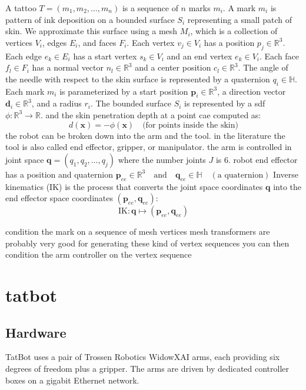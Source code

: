 \documentclass[11pt]{article}
\begin{document}
A tattoo $T = (m_1, m_2, \ldots, m_n)$ is a sequence of $n$ marks $m_i$.
A mark $m_i$ is pattern of ink deposition on a bounded surface $S_i$ representing a small patch of skin.
We approximate this surface using a mesh $M_i$, which is a collection of vertices $V_i$, edges $E_i$, and faces $F_i$.
Each vertex $v_j \in V_i$ has a position $p_j \in \mathbb{R}^3$.
Each edge $e_k \in E_i$ has a start vertex $s_k \in V_i$ and an end vertex $e_k \in V_i$.
Each face $f_l \in F_i$ has a normal vector $n_l \in \mathbb{R}^3$ and a center position $c_l \in \mathbb{R}^3$.
The angle of the needle with respect to the skin surface is represented by a quaternion $q_i \in \mathbb{H}$.
Each mark $m_i$ is parameterized by a start position \( \mathbf{p}_i \in \mathbb{R}^3 \), a direction vector \( \mathbf{d}_i \in \mathbb{R}^3 \), and a radius \( r_i \).
The bounded surface $S_i$ is represented by a sdf $\phi: \mathbb{R}^3 \to \mathbb{R}$.
and the skin penetration depth at a point cae computed as:
\[
d(\mathbf{x}) = -\phi(\mathbf{x}) \quad \text{(for points inside the skin)}
\]
the robot can be broken down into the arm and the tool.
in the literature the tool is also called end effector, gripper, or manipulator.
the arm is controlled in joint space $\mathbf{q} = (q_1, q_2, \ldots, q_j)$ where the number joints $J$ is $6$.
robot end effector has a position and quaternion $\mathbf{p}_{ee} \in \mathbb{R}^3 \quad \text{and} \quad \mathbf{q}_{ee} \in \mathbb{H} \quad (\text{a quaternion})$
Inverse kinematics (IK) is the process that converts the joint space coordinates \( \mathbf{q} \) into the end effector space coordinates \( (\mathbf{p}_{ee}, \mathbf{q}_{ee}) \):
\[
\text{IK}: \mathbf{q} \mapsto (\mathbf{p}_{ee}, \mathbf{q}_{ee})
\]

condition the mark on a sequence of mesh vertices
mesh transformers are probably very good for generating these kind of vertex sequences
you can then condition the arm controller on the vertex sequence

\pagebreak

\section{tatbot}

\subsection{Hardware}

TatBot uses a pair of Trossen Robotics WidowXAI arms, each providing six degrees of freedom plus a gripper. The arms are driven by dedicated controller boxes on a gigabit Ethernet network.
\end{document}
